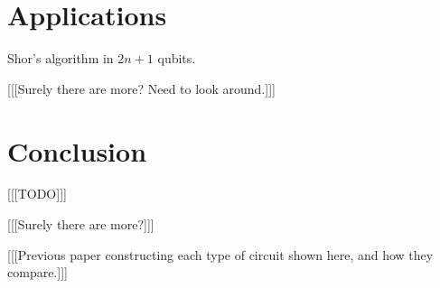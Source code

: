 \documentclass[twocolumn]{article}
\begin{document}
\section{Applications}

Shor's algorithm in $2n+1$ qubits.

[[[Surely there are more? Need to look around.]]]

\section{Conclusion}

[[[TODO]]]




[[[Surely there are more?]]]

[[[Previous paper constructing each type of circuit shown here, and how they compare.]]]
\end{document}
